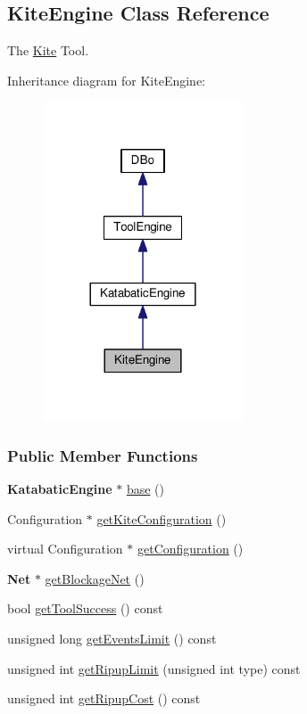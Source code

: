 \hypertarget{classKite_1_1KiteEngine}{\subsection{Kite\-Engine Class Reference}
\label{classKite_1_1KiteEngine}
}


The \hyperlink{namespaceKite}{Kite} Tool.  




Inheritance diagram for Kite\-Engine\-:\nopagebreak
\begin{figure}[H]
\begin{center}
\leavevmode
\includegraphics[width=168pt]{classKite_1_1KiteEngine__inherit__graph}
\end{center}
\end{figure}
\subsubsection*{Public Member Functions}
\begin{DoxyCompactItemize}
\item 
{\bf Katabatic\-Engine} $\ast$ \hyperlink{classKite_1_1KiteEngine_a2313df62af32702cf749c15d349af5ea}{base} ()
\item 
Configuration $\ast$ \hyperlink{classKite_1_1KiteEngine_a1af1f95e771fba5c85a19ea2d686553a}{get\-Kite\-Configuration} ()
\item 
virtual Configuration $\ast$ \hyperlink{classKite_1_1KiteEngine_a9a7fbadfe526875680f698c76adfb128}{get\-Configuration} ()
\item 
{\bf Net} $\ast$ \hyperlink{classKite_1_1KiteEngine_aef6f41b0e8265ad574d1797f46ab9fa8}{get\-Blockage\-Net} ()
\item 
bool \hyperlink{classKite_1_1KiteEngine_a41bc96a41054daf75c95534f5e9074f2}{get\-Tool\-Success} () const 
\item 
unsigned long \hyperlink{classKite_1_1KiteEngine_ae48c062468dc5dcfdaceefe5793042db}{get\-Events\-Limit} () const 
\item 
unsigned int \hyperlink{classKite_1_1KiteEngine_a7f8e279242f9b3290c704d472748f352}{get\-Ripup\-Limit} (unsigned int type) const 
\item 
unsigned int \hyperlink{classKite_1_1KiteEngine_a2fe3f5ebd3f8176172f5890a612b0174}{get\-Ripup\-Cost} () const 
\end{DoxyCompactItemize}
